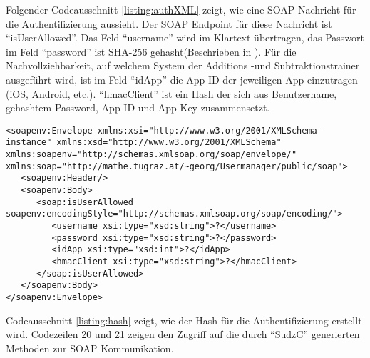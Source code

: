 Folgender Codeausschnitt \ref{listing:authXML} zeigt, wie eine SOAP Nachricht für die Authentifizierung aussieht. Der SOAP
Endpoint für diese Nachricht ist \enquote{isUserAllowed}. Das Feld \enquote{username} wird im Klartext 
übertragen, das Passwort im Feld \enquote{password} ist SHA-256 gehasht(Beschrieben in \cite{NSA2001}). Für die Nachvollziehbarkeit,
auf welchem System der Additions -und Subtraktionstrainer ausgeführt wird, ist im Feld \enquote{idApp} die App ID
der jeweiligen App einzutragen (iOS, Android, etc.). \enquote{hmacClient} ist ein Hash der sich aus Benutzername, gehashtem Password, App ID und App Key zusammensetzt.
\begin{lstlisting}[caption=SOAP XML Nachricht zur Benutzer Authentifizierung, label=listing:authXML]
<soapenv:Envelope xmlns:xsi="http://www.w3.org/2001/XMLSchema-instance" xmlns:xsd="http://www.w3.org/2001/XMLSchema" xmlns:soapenv="http://schemas.xmlsoap.org/soap/envelope/" xmlns:soap="http://mathe.tugraz.at/~georg/Usermanager/public/soap">
   <soapenv:Header/>
   <soapenv:Body>
      <soap:isUserAllowed soapenv:encodingStyle="http://schemas.xmlsoap.org/soap/encoding/">
         <username xsi:type="xsd:string">?</username>
         <password xsi:type="xsd:string">?</password>
         <idApp xsi:type="xsd:int">?</idApp>
         <hmacClient xsi:type="xsd:string">?</hmacClient>
      </soap:isUserAllowed>
   </soapenv:Body>
</soapenv:Envelope>\end{lstlisting} 
Codeausschnitt \ref{listing:hash} zeigt, wie der Hash für die Authentifizierung erstellt wird. Codezeilen
20 und 21 zeigen den Zugriff auf die durch \enquote{SudzC} generierten Methoden zur SOAP Kommunikation.
